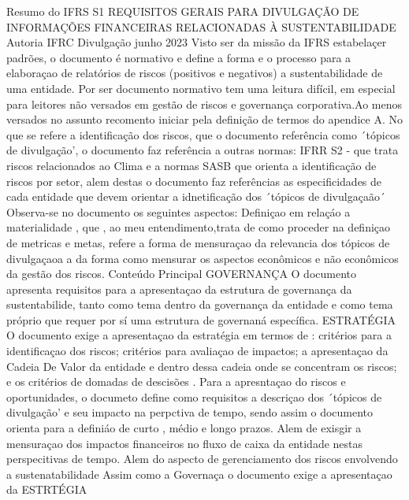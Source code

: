 Resumo do IFRS S1 REQUISITOS GERAIS PARA DIVULGAÇÃO DE INFORMAÇÕES FINANCEIRAS RELACIONADAS À SUSTENTABILIDADE
Autoria IFRC
Divulgação junho 2023
Visto ser da missão da IFRS estabelaçer padrões, o documento é normativo e define a forma e o processo para a elaboraçao de relatórios de riscos (positivos e negativos) a sustentabilidade de uma entidade.
Por ser documento normativo tem uma leitura difícil, em especial para leitores não versados em  gestão de riscos e governança corporativa.Ao menos versados no assunto recomento iniciar pela definição de termos do apendice A. 
No que se refere a identificação dos riscos, que o documento referência como ´tópicos de divulgação', o documento faz referência a outras normas:  IFRR S2 - que trata riscos relacionados ao Clima e a normas SASB que orienta a identificação de riscos por setor, alem destas o documento faz referências as especificidades de cada entidade que devem orientar a idnetificação dos ´tópicos de divulgaçaão´
Observa-se no documento os seguintes aspectos:
Definiçao em relaçáo a materialidade , que , ao meu entendimento,trata de como proceder na definiçao de metricas e metas, refere a forma de mensuraçao da relevancia dos tópicos de divulgaçaoa a da forma como mensurar os aspectos econômicos e não econômicos da gestão dos riscos.
Conteúdo Principal
GOVERNANÇA
O documento apresenta requisitos para a apresentaçao da estrutura de governança da sustentabilide, tanto como tema dentro da governança da entidade e como tema próprio que requer por sí uma estrutura de governaná específica.
ESTRATÉGIA
O documento exige a apresentaçao da estratégia em termos de : critérios para a identificaçao dos riscos;  critérios para avaliaçao de impactos; a apresentaçao da Cadeia De Valor da entidade e dentro dessa cadeia onde se concentram os riscos; e  os critérios de domadas de descisões .
Para a apresntaçao do riscos e oportunidades, o documeto define como requisitos a descriçao dos ´tópicos de divulgação' e seu impacto na perpctiva de tempo, sendo assim o documento orienta para a definiáo de curto , médio e longo prazos. Alem de exisgir a mensuraçao dos impactos financeiros no fluxo de caixa da entidade nestas perspecitivas de tempo. 
Alem do aspecto de gerenciamento dos riscos envolvendo a sustenatabilidade 
Assim como a Governaça o documento exige a apresentaçao da ESTRTÉGIA 


